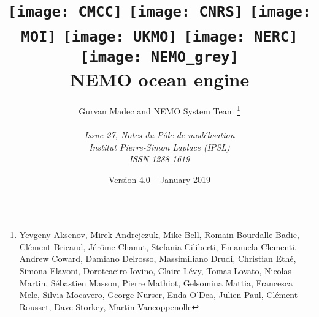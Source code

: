 \documentclass{book}
\newcommand{\biblio}{}
\newcommand{\pindex}{\printindex}
\begin{document}
\renewcommand{\biblio}{}
\renewcommand{\pindex}{}



\title{
  \texttt{[image: CMCC]}\hfill
  \texttt{[image: CNRS]}\hfill
  \texttt{[image: MOI]} \hfill
  \texttt{[image: UKMO]}\hfill
  \texttt{[image: NERC]}       \\
  \texttt{[image: NEMO\_grey]}  \\
  {\Huge NEMO ocean engine}                            \\
}
\author{
  \Large Gurvan Madec and NEMO System Team
  \thanks{
    Yevgeny Aksenov, Mirek Andrejczuk, Mike Bell, Romain Bourdalle-Badie, Cl\'{e}ment Bricaud,
    J\'{e}r\^{o}me Chanut, Stefania Ciliberti, Emanuela Clementi, Andrew Coward, Damiano Delrosso,
    Massimiliano Drudi, Christian Eth\'{e}, Simona Flavoni, Doroteaciro Iovino, Claire L\'{e}vy, Tomas Lovato,
    Nicolas Martin, S\'{e}bastien Masson, Pierre Mathiot, Gelsomina Mattia, Francesca Mele, Silvia Mocavero,
    George Nurser, Enda O'Dea, Julien Paul, Cl\'{e}ment Rousset, Dave Storkey, Martin Vancoppenolle
  }                                                        \\
                                                           \\
  \textit{Issue 27, Notes du P\^{o}le de mod\'{e}lisation} \\
  \textit{Institut Pierre-Simon Laplace (IPSL)}            \\
  \textit{ISSN 1288-1619}
}
\date{Version 4.0 -- January 2019}

\maketitle
\frontmatter


\dominitoc
\tableofcontents



\mainmatter




\end{document}
